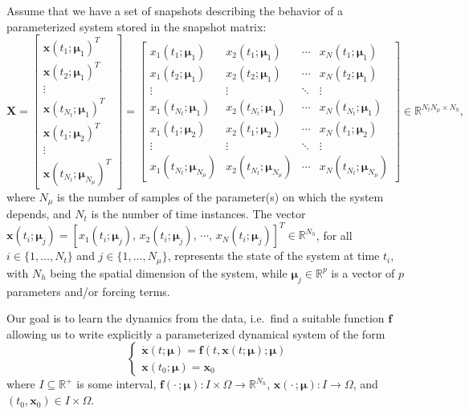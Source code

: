 \documentclass[reqno]{amsart}[standalone]
\theoremstyle{definition}
\theoremstyle{remark}
\newcommand{\R}{\mathbb{R}}
\newcommand{\bs}{\boldsymbol}
\begin{document}
Assume that we have a set of snapshots describing the behavior of a parameterized system stored in the snapshot matrix:
\begin{equation}\label{eqSINDyParam}
\bs{X}=
\begin{bmatrix}
\bs{x}(t_1; \bs{\mu}_1)^T \\
\bs{x}(t_2; \bs{\mu}_1)^T \\
\vdots \\
\bs{x}(t_{N_t}; \bs{\mu}_1)^T \\
\bs{x}(t_1; \bs{\mu}_2)^T \\
\vdots \\
\bs{x}(t_{N_t}; \bs{\mu}_{N_{\mu}})^T
\end{bmatrix}
=
\begin{bmatrix}
x_1(t_1;\bs{\mu}_1) & x_2(t_1;\bs{\mu}_1) & \cdots & x_N(t_1;\bs{\mu}_1) \\
x_1(t_2;\bs{\mu}_1) & x_2(t_2;\bs{\mu}_1) & \cdots & x_N(t_2;\bs{\mu}_1) \\
\vdots & \vdots & \ddots & \vdots\\
x_1(t_{N_t};\bs{\mu}_1) & x_2(t_{N_t};\bs{\mu}_1) & \cdots & x_N(t_{N_t};\bs{\mu}_1) \\
x_1(t_1;\bs{\mu}_2) & x_2(t_1;\bs{\mu}_2) & \cdots & x_N(t_1;\bs{\mu}_2) \\
\vdots & \vdots & \ddots & \vdots\\
x_1(t_{N_t};\bs{\mu}_{N_\mu}) & x_2(t_{N_t};\bs{\mu}_{N_\mu}) & \cdots & x_N(t_{N_t};\bs{\mu}_{N_\mu})
\end{bmatrix}
\in\mathbb{R}^{N_tN_{\mu}\times N_h},
\end{equation}
where $N_{\mu}$ is the number of samples of the parameter(s) on which the system depends, and $N_t$ is the number of time instances.
The vector $\bs{x}(t_i;\bs{\mu}_j) = [x_1(t_i;\bs{\mu}_j),\, x_2(t_i;\bs{\mu}_j),\, \cdots,\, x_N(t_i;\bs{\mu}_j)]^T\in\R^{N_h}$, for all $i\in\{1,\dots, N_t\}$ and $j\in\{1,\dots, N_\mu\}$, represents the state of the system at time $t_i$, with $N_h$ being the spatial dimension of the system, while $\bs{\mu}_j\in\R^p$ is a vector of $p$ parameters and/or forcing terms.

Our goal is to learn the dynamics from the data, i.e.\ find a suitable function $\bs{f}$ allowing us to write explicitly a parameterized dynamical system of the form
\begin{equation}\label{eqParamDyn}
    \begin{cases}
    \dot{\bs{x}}(t; \bs{\mu}) = \bs{f}(t, \bs{x}(t; \bs{\mu}); \bs{\mu})\\[1mm]
    \bs{x}(t_0; \bs{\mu}) = \bs{x}_{0}
    \end{cases}
\end{equation}
where $I\subseteq\R^+$ is some interval, $\bs{f}(\cdot\,;\bs{\mu}):I\times\Omega\to\R^{N_h}$, $\bs{x}(\cdot\,; \bs{\mu}):I\to\Omega$, and $(t_0, \bs{x}_0)\in I\times\Omega$.
\end{document}
